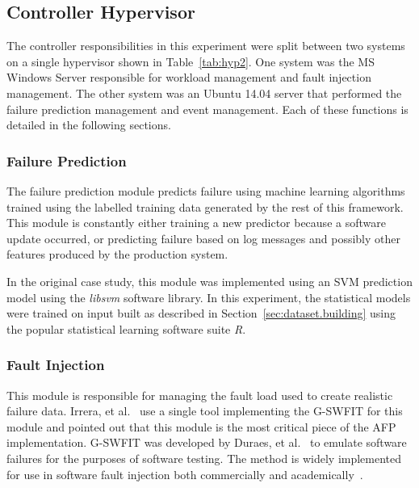 \tabHypervisorOne
\tabHypervisorTwo

\setcounter{secnumdepth}{5}

\subsection{Controller Hypervisor} \label{sec:controller} %
The controller responsibilities in this experiment were split between two
systems on a single hypervisor shown in Table~\ref{tab:hyp2}.  One system was
the \ac{MS} Windows Server responsible for workload management and fault
injection management.  The other system was an Ubuntu 14.04 server that
performed the failure prediction management and event management.  Each of
these functions is detailed in the following sections.

\subsubsection{Failure Prediction} \label{sec:failurePrediction} %
The failure prediction module predicts failure using machine learning
algorithms trained using the labelled training data generated by the rest of
this framework.  This module is constantly either training a new predictor
because a software update occurred, or predicting failure based on log messages
and possibly other features produced by the production system.

In the original case study, this module was implemented using an \ac{SVM}
prediction model using the \emph{libsvm} software library.  In this experiment,
the statistical models were trained on input built as described in
Section~\ref{sec:dataset.building} using the popular statistical learning
software suite \emph{R}.

\subsubsection{Fault Injection} \label{sec:faultInjectionMgr}
This module is responsible for managing the fault load used to create realistic
failure data.  Irrera, et al.~\cite{irrera2015} use a single tool implementing
the \ac{G-SWFIT} for this module and pointed out that this module is the most
critical piece of the \ac{AFP} implementation.  \ac{G-SWFIT} was developed by
Duraes, et al.~\cite{gswfit} to emulate software failures for the purposes of
software testing.  The method is widely implemented for use in software fault
injection both commercially and
academically~\cite{cotroneo2012,irrera2014,natella2010,umadevi2015}.  

